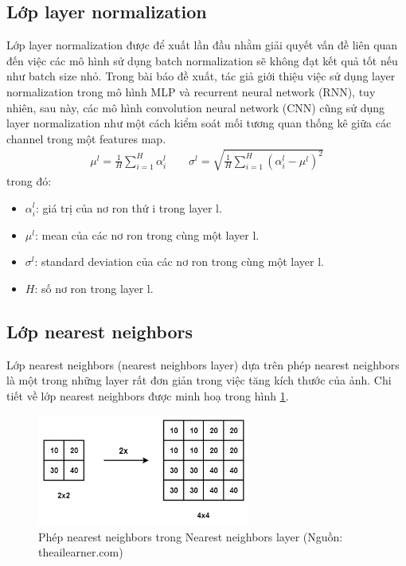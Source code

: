 {    \subsection{Lớp layer normalization}
    Lớp layer normalization được để xuất lần đầu nhằm giải quyết vấn đề liên quan đến việc các mô hình sử dụng batch normalization sẽ không đạt kết quả tốt nếu như batch size nhỏ. Trong bài báo đề xuất, tác giả giới thiệu việc sử dụng layer normalization trong mô hình MLP và recurrent neural network (RNN), tuy nhiên, sau này, các mô hình convolution neural network (CNN) cũng sử dụng layer normalization như một cách kiểm soát mối tương quan thống kê giữa các channel trong một features map.
    \begin{align}
    \mu^l = \frac{1}{H}\sum_{i = 1}^H  \alpha^l_i
    \qquad
    \sigma^l = \sqrt{\frac{1}{H}\sum_{i = 1}^H  \left( \alpha^l_i  - \mu^l \right)^2}
    \end{align}
	\noindent trong đó:
	\begin{itemize}[leftmargin=0cm,itemindent=.5cm,labelwidth=\itemindent,labelsep=0cm,align=left]
        \item $\alpha^l_i$: giá trị của nơ ron thứ i trong layer l.
        \item $\mu^l$: mean của các nơ ron trong cùng một layer l.
        \item $\sigma^l$: standard deviation của các nơ ron trong cùng một layer l.
        \item $H$: số nơ ron trong layer l.
    \end{itemize}
    \subsection{Lớp nearest neighbors }
    Lớp nearest neighbors (nearest neighbors layer) dựa trên phép nearest neighbors là một trong những layer rất đơn giản trong việc tăng kích thước của ảnh. Chi tiết về lớp nearest neighbors được minh hoạ trong hình \ref{fig:nn}.

    \begin{figure}[H]
    \centering
    \includegraphics[width=7cm] {images/nn.png}
    \caption{Phép nearest neighbors trong Nearest neighbors layer (Nguồn: theailearner.com)}
    \label{fig:nn}
    \end{figure}

}

